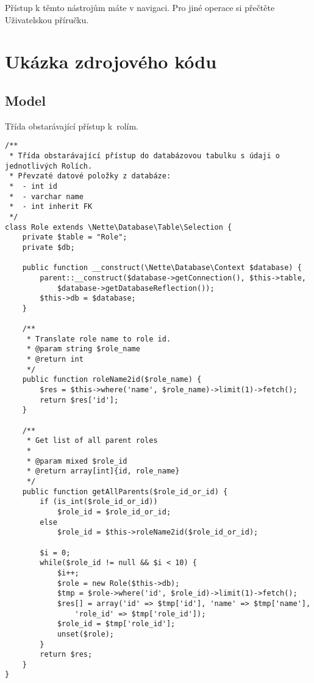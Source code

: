 \documentclass[thesis=B,czech]{FITthesis}[2012/06/26]
\begin{document}
Přístup k těmto nástrojům máte v navigaci. Pro jiné operace si přečtěte Uživatelskou příručku.

\chapter{Ukázka zdrojového kódu}

\section{Model}

Třída obstarávající přístup k~rolím.
\begin{tiny}
\begin{verbatim}
/**
 * Třída obstarávající přístup do databázovou tabulku s údaji o jednotlivých Rolích.
 * Převzaté datové položky z databáze:
 *  - int id
 *  - varchar name
 *  - int inherit FK
 */
class Role extends \Nette\Database\Table\Selection {
    private $table = "Role";
    private $db;

    public function __construct(\Nette\Database\Context $database) {
        parent::__construct($database->getConnection(), $this->table,
            $database->getDatabaseReflection());
        $this->db = $database;
    }

    /**
     * Translate role name to role id.
     * @param string $role_name
     * @return int
     */
    public function roleName2id($role_name) {
        $res = $this->where('name', $role_name)->limit(1)->fetch();
        return $res['id'];
    }
    
    /**
     * Get list of all parent roles
     * 
     * @param mixed $role_id
     * @return array[int]{id, role_name}
     */
    public function getAllParents($role_id_or_id) {
        if (is_int($role_id_or_id))
            $role_id = $role_id_or_id;
        else
            $role_id = $this->roleName2id($role_id_or_id);
        
        $i = 0;
        while($role_id != null && $i < 10) {
            $i++;
            $role = new Role($this->db);
            $tmp = $role->where('id', $role_id)->limit(1)->fetch();
            $res[] = array('id' => $tmp['id'], 'name' => $tmp['name'],
                'role_id' => $tmp['role_id']);
            $role_id = $tmp['role_id'];
            unset($role);
        }
        return $res;
    }
}

\end{verbatim}
\end{tiny}
\pagebreak
\end{document}
